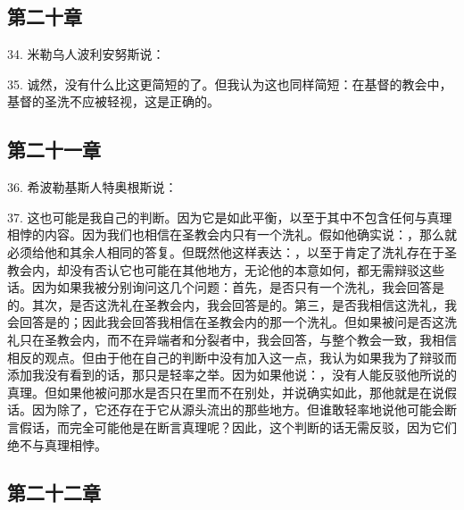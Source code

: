 
\subsection{第二十章}

34. 米勒乌人波利安努斯说：\par

35. 诚然，没有什么比这更简短的了。但我认为这也同样简短：在基督的教会中，基督的圣洗不应被轻视，这是正确的。\par


\subsection{第二十一章}

36. 希波勒基斯人特奥根斯说：\par

37. 这也可能是我自己的判断。因为它是如此平衡，以至于其中不包含任何与真理相悖的内容。因为我们也相信在圣教会内只有一个洗礼。假如他确实说：，那么就必须给他和其余人相同的答复。但既然他这样表达：，以至于肯定了洗礼存在于圣教会内，却没有否认它也可能在其他地方，无论他的本意如何，都无需辩驳这些话。因为如果我被分别询问这几个问题：首先，是否只有一个洗礼，我会回答是的。其次，是否这洗礼在圣教会内，我会回答是的。第三，是否我相信这洗礼，我会回答是的；因此我会回答我相信在圣教会内的那一个洗礼。但如果被问是否这洗礼只在圣教会内，而不在异端者和分裂者中，我会回答，与整个教会一致，我相信相反的观点。但由于他在自己的判断中没有加入这一点，我认为如果我为了辩驳而添加我没有看到的话，那只是轻率之举。因为如果他说：，没有人能反驳他所说的真理。但如果他被问那水是否只在里而不在别处，并说确实如此，那他就是在说假话。因为除了，它还存在于它从源头流出的那些地方。但谁敢轻率地说他可能会断言假话，而完全可能他是在断言真理呢？因此，这个判断的话无需反驳，因为它们绝不与真理相悖。\par


\subsection{第二十二章}

